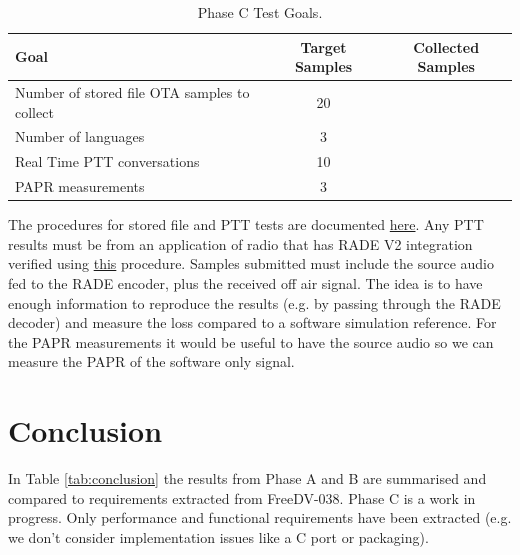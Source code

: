 \documentclass{article}
\begin{document}
\begin{table} [h]
\caption{Phase C Test Goals.}
\label{tab:phase3_goals}
\centering
\begin{tabular}{ l | c | c }
 \hline
 Goal & Target Samples & Collected Samples \\
 \hline
 Number of stored file OTA samples to collect & 20 \\
 Number of languages & 3 \\
 Real Time PTT conversations & 10 \\
 PAPR measurements & 3 \\
 \hline
 \hline
\end{tabular}
\end{table}

The procedures for stored file and PTT tests are documented \href{https://github.com/drowe67/radae/blob/0b1279995f79e00007237ec709a560b256f7daa0/README.md#testing-rade}{here}.  Any PTT results must be from an application of radio that has RADE V2 integration verified using \href{https://github.com/drowe67/radae/blob/0b1279995f79e00007237ec709a560b256f7daa0/README.md#verifying-rade-integration}{this} procedure.  Samples submitted must include the source audio fed to the RADE encoder, plus the received off air signal.  The idea is to have enough information to reproduce the results (e.g. by passing through the RADE decoder) and measure the loss compared to a software simulation reference. For the PAPR measurements it would be useful to have the source audio so we can measure the PAPR of the software only signal.

\section{Conclusion}

In Table \ref{tab:conclusion} the results from Phase A and B are summarised and compared to requirements extracted from FreeDV-038.  Phase C is a work in progress.  Only performance and functional requirements have been extracted (e.g. we don't consider implementation issues like a C port or packaging).
\end{document}
